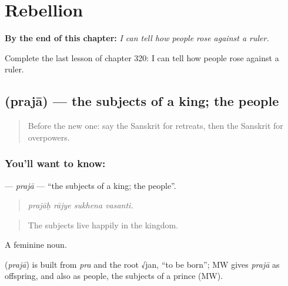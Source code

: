 
\chapter{Rebellion}
\label{ch:sa-rebellion}

\begin{chapteropening}
\textbf{By the end of this chapter:} \emph{I can tell how people rose against a ruler.}

Complete the last lesson of chapter 320: I can tell how people rose against a ruler.
\end{chapteropening}

\section[\texorpdfstring{\sk{प्रजा} (prajā)}{प्रजा (prajā)}]{ (prajā) — the subjects of a king; the people}

\label{lesson:SA-C320-praja}



\begin{quote}
Before the new one: say the Sanskrit for retreats, then the Sanskrit for overpowers.
\end{quote}

\subsection*{You'll want to know: }
\textbf{} — \emph{prajā} — \textquotedblleft{}the subjects of a king; the people\textquotedblright{}.

\begin{quote}
   
\end{quote}

\begin{quote}
\emph{prajāḥ rājye sukhena vasanti.}
\end{quote}

\begin{quote}
The subjects live happily in the kingdom.
\end{quote}

A feminine noun.

\begin{cousinweb}
\textbf{} (\emph{prajā}) is built from \emph{pra} and the root √jan, \textquotedblleft{}to be born\textquotedblright{}; MW gives \emph{prajā} as offspring, and also as people, the subjects of a prince (MW).
\end{cousinweb}

